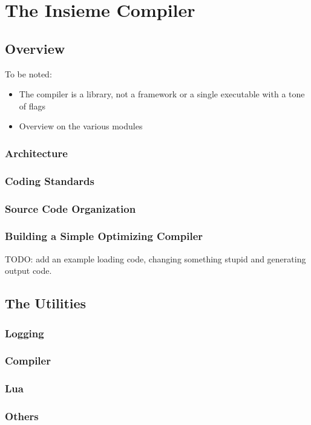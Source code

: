 \chapter{The Insieme Compiler} \label{cap:compiler}

\section{Overview}

To be noted:
\begin{itemize}
  \item The compiler is a library, not a framework or a single executable with a
  tone of flags
  \item Overview on the various modules
\end{itemize}

\subsection{Architecture}
\subsection{Coding Standards}
\subsection{Source Code Organization}
\subsection{Building a Simple Optimizing Compiler}
\label{cap:compiler:sec:overview:sub:building} TODO: add an example loading
code, changing something stupid and generating output code.

\section{The Utilities}
\subsection{Logging}
\subsection{Compiler}
\subsection{Lua}
\subsection{Others}
